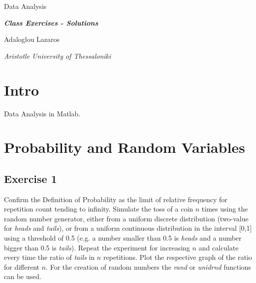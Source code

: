 \documentclass{article}
\begin{document}

\begin{titlepage}

\centering

{\huge {}Data Analysis}
\vspace{2cm}

{\Large \textit{\textbf{Class Exercises - Solutions}}}
\vspace{2cm}

{\large {}Adaloglou Lazaros}

\vfill
{\itshape Aristotle University of Thessaloniki}

\end{titlepage}

\tableofcontents

\section{Intro} \label{th1}

Data Analysis in Matlab.

\section{Probability and Random Variables} \label{th2}

\subsection{Exercise 1}
Confirm the Definition of Probability as the limit of relative frequency for repetition count tending to infinity.
Simulate the toss of a coin $n$ times using the random number generator, either from a uniform discrete distribution (two-value for \textit{heads} and \textit{tails}), or from a uniform continuous distribution in the interval [0,1] using a threshold of 0.5 (e.g. a number smaller than 0.5 is \textit{heads} and a number bigger than 0.5 is \textit{tails}). Repeat the experiment for increasing $n$ and calculate every time the ratio of \textit{tails} in $n$ repetitions. Plot the respective graph of the ratio for different $n$. For the creation of random numbers the \textit{rand} or \textit{unidrnd} functions can be used.
\end{document}
